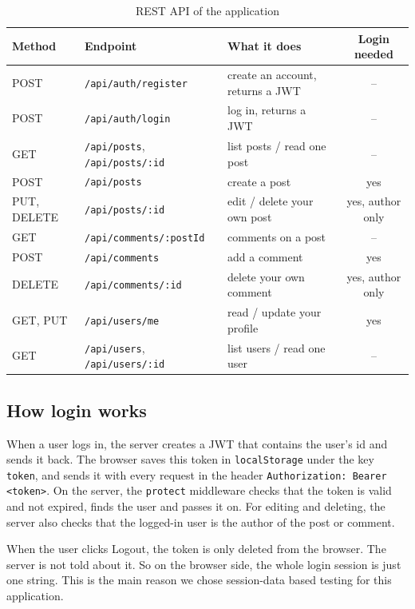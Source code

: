 \documentclass[12pt,a4paper,oneside]{report}
\newcommand{\code}[1]{\texttt{#1}}
\begin{document}
\begin{table}[H]
\centering
\small
\begin{tabular}{lllc}
\toprule
\textbf{Method} & \textbf{Endpoint} & \textbf{What it does} & \textbf{Login needed} \\
\midrule
POST & \code{/api/auth/register} & create an account, returns a JWT & -- \\
POST & \code{/api/auth/login} & log in, returns a JWT & -- \\
GET & \code{/api/posts}, \code{/api/posts/:id} & list posts / read one post & -- \\
POST & \code{/api/posts} & create a post & yes \\
PUT, DELETE & \code{/api/posts/:id} & edit / delete your own post & yes, author only \\
GET & \code{/api/comments/:postId} & comments on a post & -- \\
POST & \code{/api/comments} & add a comment & yes \\
DELETE & \code{/api/comments/:id} & delete your own comment & yes, author only \\
GET, PUT & \code{/api/users/me} & read / update your profile & yes \\
GET & \code{/api/users}, \code{/api/users/:id} & list users / read one user & -- \\
\bottomrule
\end{tabular}
\caption{REST API of the application}
\end{table}

\subsection*{How login works}

When a user logs in, the server creates a JWT that contains the user's id and
sends it back. The browser saves this token in \code{localStorage} under the
key \code{token}, and sends it with every request in the header
\code{Authorization: Bearer <token>}. On the server, the \code{protect}
middleware checks that the token is valid and not expired, finds the user and
passes it on. For editing and deleting, the server also checks that the
logged-in user is the author of the post or comment.

When the user clicks Logout, the token is only deleted from the browser. The
server is not told about it. So on the browser side, the whole login session
is just one string. This is the main reason we chose session-data based
testing for this application.
\end{document}
